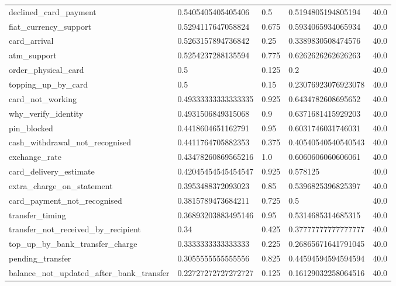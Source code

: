 \begin{table}[!ht]
\begin{tabularx}{\textwidth}{X l l l l}
declined\_card\_payment & \num{0.5405405405405406} & \num{0.5} & \num{0.5194805194805194} & \num{40.0} \\
fiat\_currency\_support & \num{0.5294117647058824} & \num{0.675} & \num{0.5934065934065934} & \num{40.0} \\
card\_arrival & \num{0.5263157894736842} & \num{0.25} & \num{0.3389830508474576} & \num{40.0} \\
atm\_support & \num{0.5254237288135594} & \num{0.775} & \num{0.6262626262626263} & \num{40.0} \\
order\_physical\_card & \num{0.5} & \num{0.125} & \num{0.2} & \num{40.0} \\
topping\_up\_by\_card & \num{0.5} & \num{0.15} & \num{0.23076923076923078} & \num{40.0} \\
card\_not\_working & \num{0.49333333333333335} & \num{0.925} & \num{0.6434782608695652} & \num{40.0} \\
why\_verify\_identity & \num{0.4931506849315068} & \num{0.9} & \num{0.6371681415929203} & \num{40.0} \\
pin\_blocked & \num{0.4418604651162791} & \num{0.95} & \num{0.6031746031746031} & \num{40.0} \\
cash\_withdrawal\_not\_recognised & \num{0.4411764705882353} & \num{0.375} & \num{0.40540540540540543} & \num{40.0} \\
exchange\_rate & \num{0.43478260869565216} & \num{1.0} & \num{0.6060606060606061} & \num{40.0} \\
card\_delivery\_estimate & \num{0.42045454545454547} & \num{0.925} & \num{0.578125} & \num{40.0} \\
extra\_charge\_on\_statement & \num{0.3953488372093023} & \num{0.85} & \num{0.5396825396825397} & \num{40.0} \\
card\_payment\_not\_recognised & \num{0.3815789473684211} & \num{0.725} & \num{0.5} & \num{40.0} \\
transfer\_timing & \num{0.36893203883495146} & \num{0.95} & \num{0.5314685314685315} & \num{40.0} \\
transfer\_not\_received\_by\_recipient & \num{0.34} & \num{0.425} & \num{0.37777777777777777} & \num{40.0} \\
top\_up\_by\_bank\_transfer\_charge & \num{0.3333333333333333} & \num{0.225} & \num{0.26865671641791045} & \num{40.0} \\
pending\_transfer & \num{0.3055555555555556} & \num{0.825} & \num{0.44594594594594594} & \num{40.0} \\
balance\_not\_updated\_after\_bank\_transfer & \num{0.22727272727272727} & \num{0.125} & \num{0.16129032258064516} & \num{40.0} \\

\end{tabularx}
\end{table}
